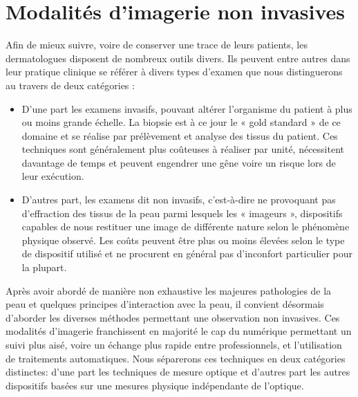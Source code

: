 \section{Modalités d’imagerie non invasives}
Afin de mieux suivre, voire de conserver une trace de leurs patients, les dermatologues disposent de nombreux outils divers. Ils peuvent entre autres dans leur pratique clinique se référer à divers types d’examen que nous distinguerons au travers de deux catégories :
\begin{itemize}
\item D’une part les examens invasifs, pouvant altérer l’organisme du patient à plus ou moins grande échelle. La biopsie est à ce jour le « gold standard » de ce domaine et se réalise par prélèvement et analyse des tissus du patient. Ces techniques sont généralement plus coûteuses à réaliser par unité, nécessitent davantage de temps et peuvent engendrer une gêne voire un risque lors de leur exécution.
\item D’autres part, les examens dit non invasifs, c’est-à-dire ne provoquant pas d’effraction des tissus de la peau parmi lesquels les « imageurs », dispositifs capables de nous restituer une image de différente nature selon le phénomène physique observé. Les coûts peuvent être plus ou moins élevées selon le type de dispositif utilisé et ne procurent en général pas d’inconfort particulier pour la plupart.
\end{itemize}\par
Après avoir abordé de manière non exhaustive les majeures pathologies de la peau et quelques principes d'interaction avec la peau, il convient désormais d'aborder les diverses méthodes permettant une observation non invasives. Ces modalités d'imagerie franchissent en majorité le cap du numérique permettant un suivi plus aisé, voire un échange plus rapide entre professionnels, et l’utilisation de traitements automatiques. Nous séparerons ces techniques en deux catégories distinctes: d’une part les techniques de mesure optique et d'autres part les autres dispositifs basées sur une mesures physique indépendante de l'optique.\par


